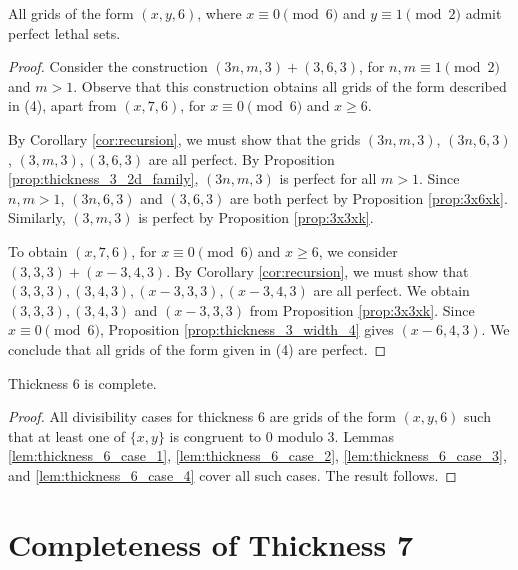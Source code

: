 \begin{lem}
\label{lem:thickness_6_case_4}
All grids of the form $(x,y,6)$, where $x \equiv 0 \pmod 6$ and $y \equiv 1 \pmod 2$ admit perfect lethal sets.
\end{lem}

\begin{proof}
Consider the construction $(3n,m,3) + (3,6,3)$, for $n,m \equiv 1 \pmod 2$ and $m > 1$. Observe that this construction obtains all grids of the form described in (4), apart from $(x,7,6)$, for $x \equiv 0 \pmod 6$ and $x \geq 6$. 

By Corollary \ref{cor:recursion}, we must show that the grids $(3n,m,3)$, $(3n,6,3)$, $(3,m,3), (3,6,3)$  are all perfect. By Proposition \ref{prop:thickness_3_2d_family}, $(3n,m,3)$ is perfect for all $m > 1$. Since $n,m > 1$, $(3n,6,3)$ and $(3,6,3)$ are both perfect by Proposition \ref{prop:3x6xk}. Similarly, $(3,m,3)$ is perfect by Proposition \ref{prop:3x3xk}.

To obtain $(x,7,6)$, for $x \equiv 0 \pmod 6$ and $x \geq 6$, we consider $(3,3,3) + (x-3, 4,3)$. By Corollary \ref{cor:recursion}, we must show that $(3,3,3), (3,4,3), (x-3,3,3), (x-3,4,3)$ are all perfect. We obtain $(3,3,3), (3,4,3)$ and $(x-3,3,3)$ from Proposition \ref{prop:3x3xk}. Since $x \equiv 0 \pmod 6$, Proposition \ref{prop:thickness_3_width_4} gives $(x-6,4,3)$. We conclude that all grids of the form given in (4) are perfect. 
\end{proof}

\begin{lem}
\label{lem:thickness_6_complete}
Thickness 6 is complete.
\end{lem}

\begin{proof}
All divisibility cases for thickness 6 are grids of the form $(x,y,6)$ such that at least one of $\{x,y\}$ is congruent to 0 modulo 3. Lemmas \ref{lem:thickness_6_case_1}, \ref{lem:thickness_6_case_2}, \ref{lem:thickness_6_case_3}, and \ref{lem:thickness_6_case_4} cover all such cases. The result follows.
\end{proof}

\section{Completeness of Thickness 7}

